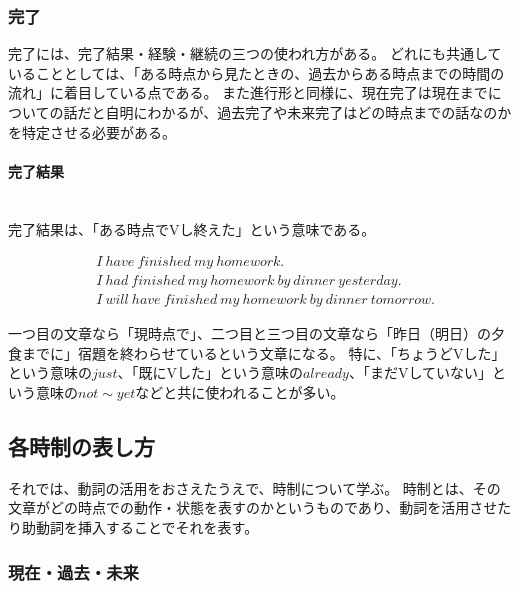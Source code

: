 \subsubsection{完了}

完了には、完了結果・経験・継続の三つの使われ方がある。
どれにも共通していることとしては、「ある時点から見たときの、過去からある時点までの時間の流れ」に着目している点である。
また進行形と同様に、現在完了は現在までについての話だと自明にわかるが、過去完了や未来完了はどの時点までの話なのかを特定させる必要がある。

\paragraph{完了結果}\quad\\

完了結果は、「ある時点でVし終えた」という意味である。

\begin{align}
  &I ~ have ~ finished ~ my ~ homework \text{.}\\
  &I ~ had  ~ finished ~ my ~ homework ~ by ~ dinner ~ yesterday \text{.}\\
  &I ~ will ~ have ~ finished ~ my ~ homework ~ by ~ dinner ~ tomorrow \text{.}
\end{align}

一つ目の文章なら「現時点で」、二つ目と三つ目の文章なら「昨日（明日）の夕食までに」宿題を終わらせているという文章になる。
特に、「ちょうどVした」という意味の$just$、「既にVした」という意味の$already$、「まだVしていない」という意味の$not \sim yet$などと共に使われることが多い。



\subsection{各時制の表し方}

それでは、動詞の活用をおさえたうえで、時制について学ぶ。
時制とは、その文章がどの時点での動作・状態を表すのかというものであり、動詞を活用させたり助動詞を挿入することでそれを表す。

\subsubsection{現在・過去・未来}

